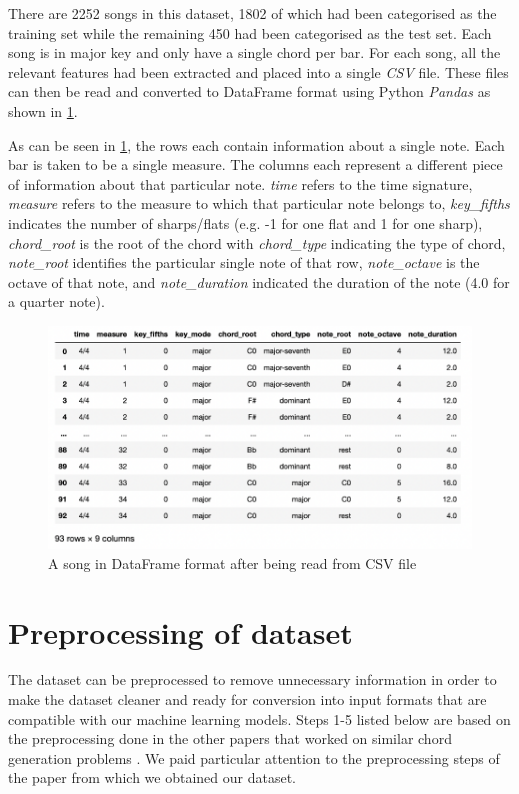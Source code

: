 There are 2252 songs in this dataset, 1802 of which had been categorised as the training set while the remaining 450 had been categorised as the test set. Each song is in major key and only have a single chord per bar. For each song, all the relevant features had been extracted and placed into a single \emph{CSV} file. These files can then be read and converted to DataFrame format using Python \emph{Pandas} as shown in \cref{fig:CSV_DF}.

As can be seen in \cref{fig:CSV_DF}, the rows each contain information about a single note. Each bar is taken to be a single measure. The columns each represent a different piece of information about that particular note. \emph{time} refers to the time signature, \emph{measure} refers to the measure to which that particular note belongs to, \emph{key\_fifths} indicates the number of sharps/flats (e.g. -1 for one flat and 1 for one sharp), \emph{chord\_root} is the root of the chord with \emph{chord\_type} indicating the type of chord, \emph{note\_root} identifies the particular single note of that row, \emph{note\_octave} is the octave of that note, and \emph{note\_duration} indicated the duration of the note (4.0 for a quarter note).

\begin{figure}
\centering
\includegraphics{Figures/CSV dataframe}
\decoRule
\caption{A song in DataFrame format after being read from CSV file}
\label{fig:CSV_DF}
\end{figure}

\section{Preprocessing of dataset}
\label{preprocessing}

The dataset can be preprocessed to remove unnecessary information in order to make the dataset cleaner and ready for conversion into input formats that are compatible with our machine learning models. Steps 1-5 listed below are based on the preprocessing done in the other papers that worked on similar chord generation problems \cite{MySong} \cite{BLSTM} \cite{MLForChords}. We paid particular attention to the preprocessing steps of the paper \cite{BLSTM} from which we obtained our dataset.

